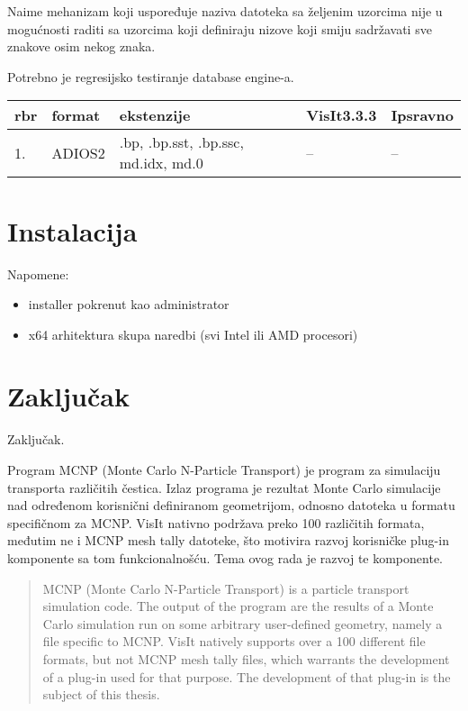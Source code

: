 \documentclass[times, utf8, zavrsni]{fer}
\begin{document}
Naime mehanizam koji uspoređuje naziva datoteka sa željenim uzorcima nije u mogućnosti raditi sa uzorcima koji definiraju nizove koji smiju sadržavati sve znakove osim nekog znaka.

Potrebno je regresijsko testiranje database engine-a.
	\begin{longtable}{|l|p{70pt}|p{100pt}|p{100pt}| p{100pt}|}
	\hline
	rbr & format & ekstenzije & VisIt3.3.3 & Ipsravno\\
	\hline
	\endhead %
	1. & ADIOS2 & .bp, .bp.sst, .bp.ssc, md.idx, md.0 & -- & --\\
	\hline
\end{longtable}


\chapter{Instalacija}
Napomene:
\begin{itemize}
	\item installer pokrenut kao administrator
	\item x64 arhitektura skupa naredbi (svi Intel ili AMD procesori)
\end{itemize}



\chapter{Zaključak}
Zaključak.




\begin{sazetak}
Program MCNP (Monte Carlo N-Particle Transport) je program za simulaciju transporta različitih čestica.
Izlaz programa je rezultat Monte Carlo simulacije nad određenom korisnični definiranom geometrijom, odnosno datoteka u formatu specifičnom za MCNP.
VisIt nativno podržava preko 100 različitih formata, međutim ne i MCNP mesh tally datoteke, što motivira razvoj korisničke plug-in komponente sa tom funkcionalnošću.
Tema ovog rada je razvoj te komponente.

\end{sazetak}

\begin{abstract}
MCNP (Monte Carlo N-Particle Transport) is a particle transport simulation code.
The output of the program are the results of a Monte Carlo simulation run on some arbitrary user-defined geometry, namely a file specific to MCNP.
VisIt natively supports over a 100 different file formats, but not MCNP mesh tally files, which warrants the development of a plug-in used for that purpose.
The development of that plug-in is the subject of this thesis. 

\end{abstract}
\end{document}
